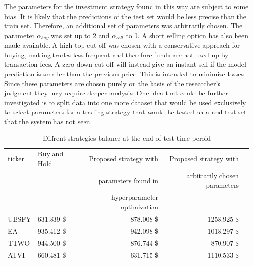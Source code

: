 \documentclass[review]{elsarticle} %
\begin{document}
The parameters for the investment strategy found in this way are subject to some bias. It is likely that the predictions of the test set would be less precise than the train set. Therefore, an additional set of parameters was arbitrarily chosen. The parameter $\alpha_{buy}$  was set up to 2 and $\alpha_{sell}$  to 0. A short selling option has also been made available.  A high top-cut-off was chosen with a conservative approach for buying, making trades less frequent and therefore funds are not used up by transaction fees. A zero down-cut-off will instead give an instant sell if the model prediction is smaller than the previous price. This is intended to minimize losses. Since these parameters are chosen purely on the basis of the researcher's judgment they may require deeper analysis. One idea that could be further investigated is to split data into one more dataset that would be used exclusively to select parameters for a trading strategy that would be tested on a real test set that the system has not seen. 

\begin{table}[H]
\centering
\caption{Diffrent strategies balance at the end of test time peroid}
\begin{tabular}{llrrr}
\toprule
 ticker &  Buy and Hold &  Proposed strategy with  &  Proposed strategy with  \\
  &        &                                        parameters found in  &                                           arbitrarily chosen parameters \\
  &        &                                         hyperparameter optimization &                                            \\

 \midrule
  UBSFY &       631.839 \$&                                            878.008 \$ &                                           1258.925 \$\\
    EA &       935.412 \$&                                           942.098 \$&                                           1018.297 \$\\
   TTWO &       944.500 \$&                                            876.744 \$&                                            870.907 \$\\
   ATVI &       660.481 \$&                                            631.715 \$&                                           1110.533 \$\\
\bottomrule
\end{tabular}
\end{table}
\end{document}

